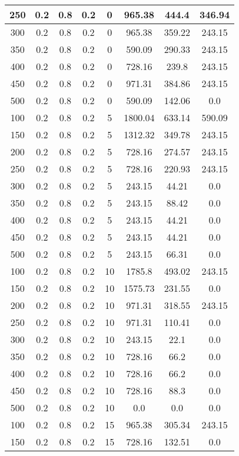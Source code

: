 \documentclass[a4paper, 12pt]{extreport}
\begin{document}
\begin{itemize}
\begin{longtable}{|c|c|c|c|c|c|c|c|}
			250 & 0.2 & 0.8 & 0.2 & 0 & 965.38 & 444.4 & 346.94 \\\hline
			300 & 0.2 & 0.8 & 0.2 & 0 & 965.38 & 359.22 & 243.15 \\\hline
			350 & 0.2 & 0.8 & 0.2 & 0 & 590.09 & 290.33 & 243.15 \\\hline
			400 & 0.2 & 0.8 & 0.2 & 0 & 728.16 & 239.8 & 243.15 \\\hline
			450 & 0.2 & 0.8 & 0.2 & 0 & 971.31 & 384.86 & 243.15 \\\hline
			500 & 0.2 & 0.8 & 0.2 & 0 & 590.09 & 142.06 & 0.0 \\\hline
			100 & 0.2 & 0.8 & 0.2 & 5 & 1800.04 & 633.14 & 590.09 \\\hline
			150 & 0.2 & 0.8 & 0.2 & 5 & 1312.32 & 349.78 & 243.15 \\\hline
			200 & 0.2 & 0.8 & 0.2 & 5 & 728.16 & 274.57 & 243.15 \\\hline
			250 & 0.2 & 0.8 & 0.2 & 5 & 728.16 & 220.93 & 243.15 \\\hline
			300 & 0.2 & 0.8 & 0.2 & 5 & 243.15 & 44.21 & 0.0 \\\hline
			350 & 0.2 & 0.8 & 0.2 & 5 & 243.15 & 88.42 & 0.0 \\\hline
			400 & 0.2 & 0.8 & 0.2 & 5 & 243.15 & 44.21 & 0.0 \\\hline
			450 & 0.2 & 0.8 & 0.2 & 5 & 243.15 & 44.21 & 0.0 \\\hline
			500 & 0.2 & 0.8 & 0.2 & 5 & 243.15 & 66.31 & 0.0 \\\hline
			100 & 0.2 & 0.8 & 0.2 & 10 & 1785.8 & 493.02 & 243.15 \\\hline
			150 & 0.2 & 0.8 & 0.2 & 10 & 1575.73 & 231.55 & 0.0 \\\hline
			200 & 0.2 & 0.8 & 0.2 & 10 & 971.31 & 318.55 & 243.15 \\\hline
			250 & 0.2 & 0.8 & 0.2 & 10 & 971.31 & 110.41 & 0.0 \\\hline
			300 & 0.2 & 0.8 & 0.2 & 10 & 243.15 & 22.1 & 0.0 \\\hline
			350 & 0.2 & 0.8 & 0.2 & 10 & 728.16 & 66.2 & 0.0 \\\hline
			400 & 0.2 & 0.8 & 0.2 & 10 & 728.16 & 66.2 & 0.0 \\\hline
			450 & 0.2 & 0.8 & 0.2 & 10 & 728.16 & 88.3 & 0.0 \\\hline
			500 & 0.2 & 0.8 & 0.2 & 10 & 0.0 & 0.0 & 0.0 \\\hline
			100 & 0.2 & 0.8 & 0.2 & 15 & 965.38 & 305.34 & 243.15 \\\hline
			150 & 0.2 & 0.8 & 0.2 & 15 & 728.16 & 132.51 & 0.0 \\\hline

\end{longtable}
\end{itemize}
\end{document}
